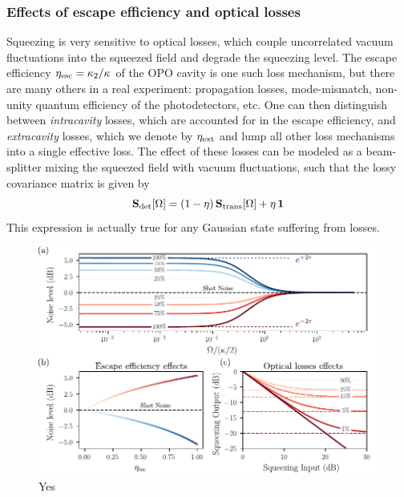 \subsubsection{Effects of escape efficiency and optical losses}
Squeezing is very sensitive to optical losses, which couple uncorrelated vacuum fluctuations into the squeezed field and degrade the squeezing level. The escape efficiency $\eta_{\rm esc}=\kappa_2/\kappa$ of the OPO cavity is one such loss mechanism, but there are many others in a real experiment: propagation losses, mode-mismatch, non-unity quantum efficiency of the photodetectors, etc. One can then distinguish between \textit{intracavity} losses, which are accounted for in the escape efficiency, and \textit{extracavity} losses, which we denote by $\eta_{\rm ext}$ and lump all other loss mechanisms into a single effective loss. The effect of these losses can be modeled as a beam-splitter mixing the squeezed field with vacuum fluctuations, such that the lossy covariance matrix is given by
\begin{equation}\mathbf{S}_{\rm det}[\Omega] = (1-\eta) \, \mathbf{S}_{\rm trans}[\Omega] + \eta \, \mathbf{1}
  \label{II.xx3}
\end{equation}
This expression is actually true for any Gaussian state suffering from losses. 
\begin{figure}[h!]
\centering
\includegraphics[width=\textwidth]{./chap2/fig/OPONoises.pdf}
\caption{Yes} 
\end{figure}



